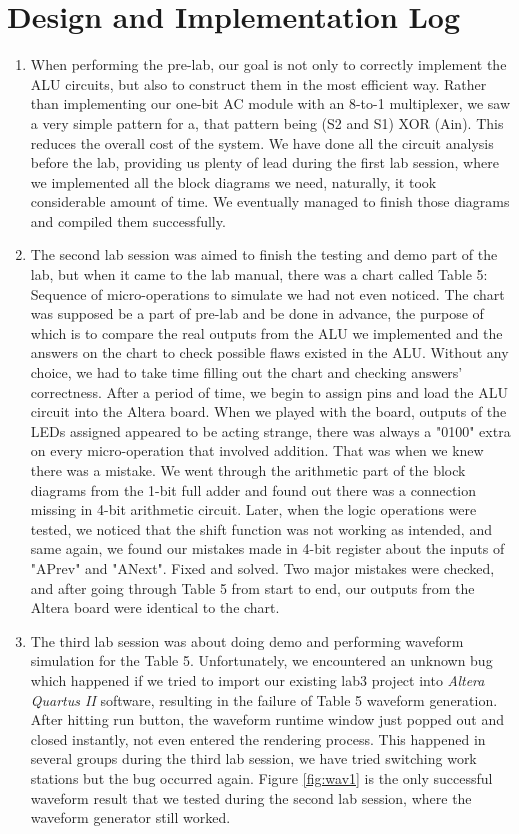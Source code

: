 \documentclass[a4paper,12pt]{article}
\begin{document}
\section{Design and Implementation Log}
\begin{enumerate}
\item When performing the pre-lab, our goal is not only to correctly implement the ALU circuits, but also to construct them in the most efficient way. Rather than implementing our one-bit AC module with an 8-to-1 multiplexer, we saw a very simple pattern for a, that pattern being (S2 and S1) XOR (Ain). This reduces the overall cost of the system. We have done all the circuit analysis before the lab, providing us plenty of lead during the first lab session, where we implemented all the block diagrams we need, naturally, it took considerable amount of time. We eventually managed to finish those diagrams and compiled them successfully. 
\item The second lab session was aimed to finish the testing and demo part of the lab, but when it came to the lab manual, there was a chart called Table 5: Sequence of micro-operations to simulate we had not even noticed. The chart was supposed be a part of pre-lab and be done in advance, the purpose of which is to compare the real outputs from the ALU we implemented and the answers on the chart to check possible flaws existed in the ALU. Without any choice, we had to take time filling out the chart and checking answers' correctness. After a period of time, we begin to assign pins and load the ALU circuit into the Altera board. When we played with the board, outputs of the LEDs assigned appeared to be acting strange, there was always a "0100" extra on every micro-operation that involved addition. That was when we knew there was a mistake. We went through the arithmetic part of the block diagrams from the 1-bit full adder and found out there was a connection missing in 4-bit arithmetic circuit. Later, when the logic operations were tested, we noticed that the shift function was not working as intended, and same again, we found our mistakes made in 4-bit register about the inputs of "APrev" and "ANext". Fixed and solved.
Two major mistakes were checked, and after going through Table 5 from start to end, our outputs from the Altera board were identical to the chart. 
\item The third lab session was about doing demo and performing waveform simulation for the Table 5. Unfortunately, we encountered an unknown bug which happened if we tried to import our existing lab3 project into \textit{Altera Quartus II} software, resulting in the failure of Table 5 waveform generation. After hitting run button, the waveform runtime window just popped out and closed instantly, not even entered the rendering process. This happened in several groups during the third lab session, we have tried switching work stations but the bug occurred again. Figure \ref{fig:wav1} is the only successful waveform result that we tested during the second lab session, where the waveform generator still worked.
\end{enumerate}
\newpage
\end{document}

